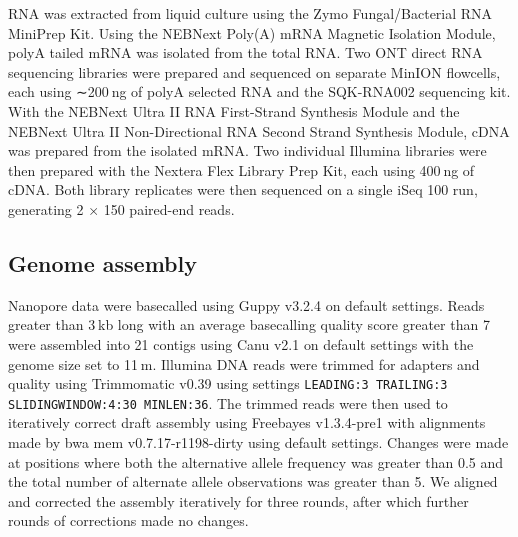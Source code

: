 RNA was extracted from liquid culture using the Zymo Fungal/Bacterial RNA MiniPrep Kit. Using the NEBNext Poly(A) mRNA Magnetic Isolation Module, polyA tailed mRNA was isolated from the total RNA. Two ONT direct RNA sequencing libraries were prepared and sequenced on separate MinION flowcells, each using ∼200 ng of polyA selected RNA and the SQK-RNA002 sequencing kit. With the NEBNext Ultra II RNA First-Strand Synthesis Module and the NEBNext Ultra II Non-Directional RNA Second Strand Synthesis Module, cDNA was prepared from the isolated mRNA. Two individual Illumina libraries were then prepared with the Nextera Flex Library Prep Kit, each using 400 ng of cDNA. Both library replicates were then sequenced on a single iSeq 100 run, generating 2 × 150 paired-end reads.

\subsection{Genome assembly}
\label{sec:methods}

Nanopore data were basecalled using Guppy v3.2.4 on default settings. Reads greater than 3 kb long with an average basecalling quality score greater than 7 were assembled into 21 contigs using Canu v2.1 \citep{Koren2017-wf} on default settings with the genome size set to 11 m. Illumina DNA reads were trimmed for adapters and quality using Trimmomatic v0.39 \citep{Bolger2014-ax} using settings \texttt{LEADING:3 TRAILING:3 SLIDINGWINDOW:4:30 MINLEN:36}. The trimmed reads were then used to iteratively correct draft assembly using Freebayes v1.3.4-pre1 \citep{Garrison2012-iq} with alignments made by bwa mem v0.7.17-r1198-dirty \citep{Li2013-ec} using default settings. Changes were made at positions where both the alternative allele frequency was greater than 0.5 and the total number of alternate allele observations was greater than 5. We aligned and corrected the assembly iteratively for three rounds, after which further rounds of corrections made no changes.

